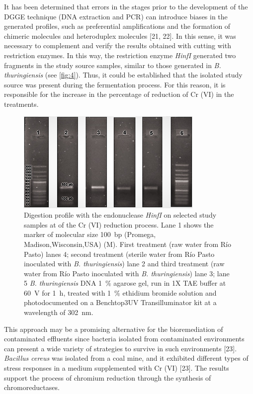 \documentclass{univsciauth}
\begin{document}
It has been determined that errors in the stages prior to the
development of the DGGE technique (DNA extraction and PCR) can introduce
biases in the generated profiles, such as preferential amplifications
and the formation of chimeric molecules and heteroduplex molecules
{[}21, 22{]}. In this sense, it was necessary to complement and verify
the results obtained with cutting with restriction enzymes. In this way,
the restriction enzyme \emph{HinfI} generated two fragments in the study
source samples, similar to those generated in \emph{B. thuringiensis}
(see \autoref{fig:4}). Thus, it could be established that the isolated study
source was present during the fermentation process. For this reason, it
is responsible for the increase in the percentage of reduction of Cr
(VI) in the treatments.
\begin{figure}[t!]
        \centering
        \includegraphics[width=0.8\textwidth]{figures/Figure4.jpg}
        \caption{
                Digestion profile with the endonuclease \emph{HinfI} on
                selected study samples at of the Cr (VI) reduction process.
                Lane 1 shows the marker of molecular size \SI{100}{bp} (Promega,
                Madison,Wisconsin,USA) (M). First treatment (raw water from Río
                Pasto) lanes 4; second treatment (sterile water from Río Pasto
                inoculated with \emph{B. thuringiensis}) lane 2 and third
                treatment (raw water from Río Pasto inoculated with \emph{B.
                thuringiensis}) lane 3; lane 5 \emph{B. thuringiensis} DNA \SI{1}{\%}
                agarose gel, run in 1X TAE buffer at \SI{60}{V} for \SI{1}{h},
                treated with \SI{1}{\%} ethidium bromide solution and photodocumented
                on a Benchtop3UV Transilluminator kit at a wavelength of \SI{302}{nm}.
        }
        \label{fig:4}
\end{figure}

This approach may be a promising alternative for the bioremediation of
contaminated effluents since bacteria isolated from contaminated
environments can present a wide variety of strategies to survive in such
environments {[}23{]}. \emph{Bacillus cereus} was isolated from a coal
mine, and it exhibited different types of stress responses in a medium
supplemented with Cr (VI) {[}23{]}. The results support the process of
chromium reduction through the synthesis of chromoreductases.
\end{document}
